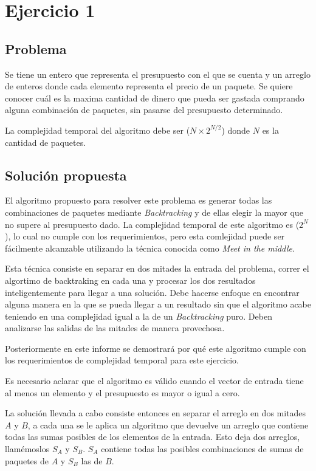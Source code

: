 \section{Ejercicio 1}

\subsection{Problema}

Se tiene un entero que representa el presupuesto con el que se cuenta y un
arreglo de enteros donde cada elemento representa el precio de un paquete. Se
quiere conocer cuál es la maxima cantidad de dinero que pueda ser gastada
comprando alguna combinación de paquetes, sin pasarse del presupuesto
determinado.

La complejidad temporal del algoritmo debe ser \ord($N \times 2^{N / 2}$) donde
$N$ es la cantidad de paquetes.

\subsection{Solución propuesta}

El algoritmo propuesto para resolver este problema es generar todas las
combinaciones de paquetes mediante \textit{Backtracking} y de ellas elegir la
mayor que no supere al presupuesto dado. La complejidad temporal de este
algoritmo es \ord($2^N$), lo cual no cumple con los requerimientos, pero esta
comlejidad puede ser fácilmente alcanzable utilizando la técnica conocida como
\textit{Meet in the middle}.

Esta técnica consiste en separar en dos mitades la entrada del problema, correr
el algortimo de backtraking en cada una y procesar los dos resultados
inteligentemente para llegar a una solución. Debe hacerse enfoque en encontrar
alguna manera en la que se pueda llegar a un resultado sin que el algoritmo
acabe teniendo en una complejidad igual a la de un \textit{Backtracking} puro.
Deben analizarse las salidas de las mitades de manera provechosa.

Posteriormente en este informe se demostrará por qué este algoritmo cumple con
los requerimientos de complejidad temporal para este ejercicio.

Es necesario aclarar que el algoritmo es válido cuando el vector de entrada
tiene al menos un elemento y el presupuesto es mayor o igual a cero.

La solución llevada a cabo consiste entonces en separar el arreglo en dos
mitades $A$ y $B$, a cada una se le aplica un algoritmo que devuelve un arreglo
que contiene todas las sumas posibles de los elementos de la entrada. Esto deja
dos arreglos, llamémoslos $S_A$ y $S_B$. $S_A$ contiene todas las posibles
combinaciones de sumas de paquetes de $A$ y $S_B$ las de $B$.

